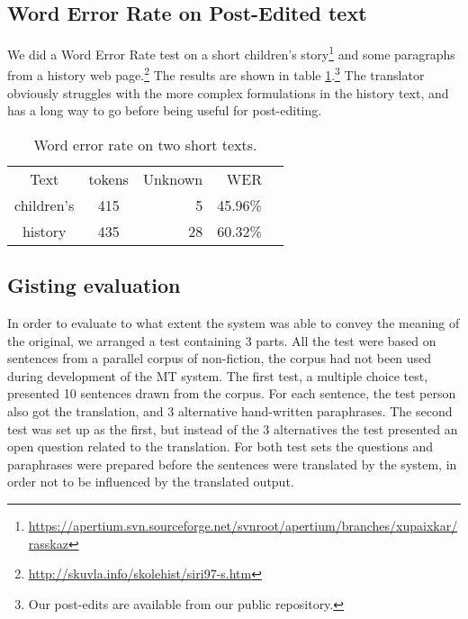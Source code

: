 \documentclass{book}
\begin{document}
\subsection{Word Error Rate on Post-Edited text}
\label{sec:WER}
We did a Word Error Rate test on a short children's
story\footnote{\href{https://apertium.svn.sourceforge.net/svnroot/apertium/branches/xupaixkar/rasskaz}{https://apertium.svn.sourceforge.net/svnroot/apertium/branches/xupaixkar/rasskaz}}
and some paragraphs from a history web
page.\footnote{\href{http://skuvla.info/skolehist/siri97-s.htm}{http://skuvla.info/skolehist/siri97-s.htm}}
The results are shown in table \ref{table:wer}.\footnote{Our post-edits
  are available from our public repository.} The translator obviously
struggles with the more complex formulations in the history text, and
has a long way to go before being useful for post-editing.


\begin{table}
  \begin{center}
  \begin{tabular}{ccrrr}
   Text       & tokens & Unknown & WER  \\
   children's & 415     & 5      & 45.96\% \\
   history    & 435     & 28     & 60.32\%  \\
  \end{tabular}
    \caption{Word error rate on two short texts.}
    \label{table:wer}
  \end{center}
\end{table}


\subsection{Gisting evaluation}
  
In order to evaluate to what extent the system was able to convey the
meaning of the original, we arranged a test containing 3 parts. All
the test were based on sentences from a parallel corpus of
non-fiction, the corpus had not been used during development of the MT
system. The first test, a multiple choice test, presented 10 sentences
drawn from the corpus. For each sentence, the test person also got the
translation, and 3 alternative hand-written paraphrases. The second
test was set up as the first, but instead of the 3 alternatives the
test presented an open question related to the translation. For both
test sets the questions and paraphrases were prepared before the
sentences were translated by the system, in order not to be influenced
by the translated output.
\end{document}
